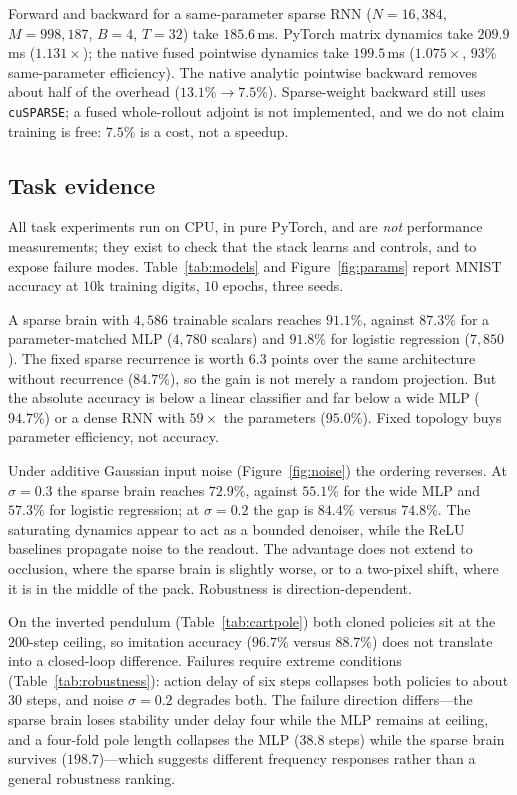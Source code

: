 \documentclass[11pt]{article}
\begin{document}
Forward and backward for a same-parameter sparse RNN ($N = 16{,}384$,
$M = 998{,}187$, $B = 4$, $T = 32$) take $185.6$\,ms. PyTorch matrix dynamics
take $209.9$\,ms ($1.131\times$); the native fused pointwise dynamics take
$199.5$\,ms ($1.075\times$, $93\%$ same-parameter efficiency). The native
analytic pointwise backward removes about half of the overhead ($13.1\% \to
7.5\%$). Sparse-weight backward still uses \texttt{cuSPARSE}; a fused
whole-rollout adjoint is not implemented, and we do not claim training is free:
$7.5\%$ is a cost, not a speedup.

\subsection{Task evidence}
\label{sec:tasks}

All task experiments run on CPU, in pure PyTorch, and are \emph{not} performance
measurements; they exist to check that the stack learns and controls, and to
expose failure modes. Table~\ref{tab:models} and Figure~\ref{fig:params} report
MNIST accuracy at $10$k training digits, $10$ epochs, three seeds.




A sparse brain with $4{,}586$ trainable scalars reaches $91.1\%$, against
$87.3\%$ for a parameter-matched MLP ($4{,}780$ scalars) and $91.8\%$ for logistic
regression ($7{,}850$). The fixed sparse recurrence is worth $6.3$ points over the
same architecture without recurrence ($84.7\%$), so the gain is not merely a
random projection. But the absolute accuracy is below a linear classifier and far
below a wide MLP ($94.7\%$) or a dense RNN with $59\times$ the parameters
($95.0\%$). Fixed topology buys parameter efficiency, not accuracy.

Under additive Gaussian input noise (Figure~\ref{fig:noise}) the ordering
reverses. At $\sigma = 0.3$ the sparse brain reaches $72.9\%$, against $55.1\%$
for the wide MLP and $57.3\%$ for logistic regression; at $\sigma = 0.2$ the gap
is $84.4\%$ versus $74.8\%$. The saturating dynamics appear to act as a bounded
denoiser, while the ReLU baselines propagate noise to the readout. The advantage
does not extend to occlusion, where the sparse brain is slightly worse, or to a
two-pixel shift, where it is in the middle of the pack. Robustness is
direction-dependent.



On the inverted pendulum (Table~\ref{tab:cartpole}) both cloned policies sit at
the $200$-step ceiling, so imitation accuracy ($96.7\%$ versus $88.7\%$) does not
translate into a closed-loop difference. Failures require extreme conditions
(Table~\ref{tab:robustness}): action delay of six steps collapses both policies
to about $30$ steps, and noise $\sigma = 0.2$ degrades both. The failure
direction differs---the sparse brain loses stability under delay four while the
MLP remains at ceiling, and a four-fold pole length collapses the MLP
($38.8$ steps) while the sparse brain survives ($198.7$)---which suggests
different frequency responses rather than a general robustness ranking.
\end{document}
